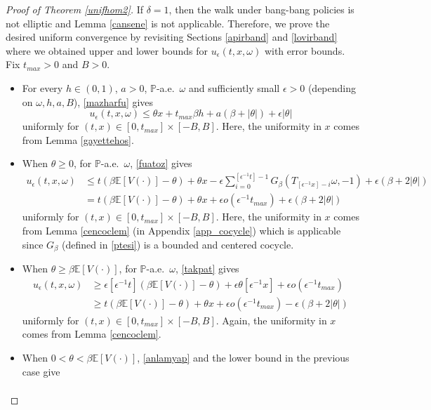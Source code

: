 \documentclass[a4paper]{amsart}
\numberwithin{equation}{section}
\theoremstyle{plain}
\theoremstyle{remark}
\begin{document}
\begin{proof}[Proof of Theorem \ref{unifhom2}]
If $\delta = 1$, then the walk under bang-bang policies is not elliptic and Lemma \ref{cansene} is not applicable. Therefore, we prove the desired uniform convergence by revisiting Sections \ref{apirband} and \ref{lovirband} where we obtained upper and lower bounds for $u_{\epsilon}(t,x,\omega)$ with error bounds. Fix $t_{max}>0$ and $B>0$.
\begin{itemize}
	\item For every $h\in(0,1)$, $a>0$, $\mathbb{P}$-a.e.\ $\omega$ and sufficiently small ${\epsilon}>0$ (depending on $\omega,h,a,B$), \eqref{mazharfu} gives
	$$u_{\epsilon}(t,x,\omega) \le \theta x + t_{max}\beta h + a(\beta + |\theta|) + {\epsilon}|\theta|$$
	uniformly for $(t,x)\in[0,t_{max}]\times[-B,B]$. Here, the uniformity in $x$ comes from Lemma \ref{gayettehos}.
	\item When $\theta\ge 0$, for $\mathbb{P}$-a.e.\ $\omega$, \eqref{fuatoz} gives
    \begin{align*}
    u_{\epsilon}(t,x,\omega) &\le t(\beta\mathbb{E}[V(\cdot)] - \theta) + \theta x - {\epsilon}\sum_{i=0}^{[{\epsilon^{-1}} t] - 1}G_\beta(T_{[{\epsilon^{-1}} x] - i}\omega,-1) + {\epsilon}(\beta + 2|\theta|)\\
    &= t(\beta\mathbb{E}[V(\cdot)] - \theta) + \theta x + {\epsilon} o({\epsilon^{-1}} t_{max}) + {\epsilon}(\beta + 2|\theta|)
    \end{align*}
    uniformly for $(t,x)\in[0,t_{max}]\times[-B,B]$. Here, the uniformity in $x$ comes from Lemma \ref{cencoclem} (in Appendix \ref{app_cocycle}) which is applicable since $G_\beta$ (defined in \eqref{ptesi}) is a bounded and centered cocycle.
    \item When $\theta\ge\beta\mathbb{E}[V(\cdot)]$, for $\mathbb{P}$-a.e.\ $\omega$, \eqref{takpat} gives
    \begin{align*}
    u_{\epsilon}(t,x,\omega) &\ge {\epsilon}[{\epsilon^{-1}} t](\beta\mathbb{E}[V(\cdot)] - \theta) + {\epsilon}\theta[{\epsilon^{-1}} x] + {\epsilon} o({\epsilon^{-1}} t_{max})\\
    &\ge t(\beta\mathbb{E}[V(\cdot)] - \theta) + \theta x + {\epsilon} o({\epsilon^{-1}} t_{max}) - {\epsilon}(\beta + 2|\theta|)
    \end{align*}
    uniformly for $(t,x)\in[0,t_{max}]\times[-B,B]$. Again, the uniformity in $x$ comes from Lemma \ref{cencoclem}.
    \item When $0<\theta<\beta\mathbb{E}[V(\cdot)]$, \eqref{anlamyap} and the lower bound in the previous case give
    \begin{align*}

\end{align*}
\end{itemize}
\end{proof}
\end{document}
